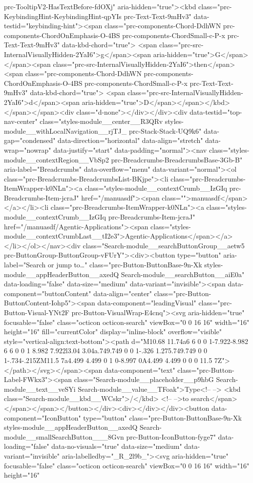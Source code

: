 {{prc-TooltipV2-HasTextBefore-fdOXj" aria-hidden="true"><kbd class="prc-KeybindingHint-KeybindingHint-qpYIs prc-Text-Text-9mHv3" data-testid="keybinding-hint"><span class="prc-components-Chord-DdhWN prc-components-ChordOnEmphasis-O-4BS prc-components-ChordSmall-c-P-x prc-Text-Text-9mHv3" data-kbd-chord="true"> <span class="prc-src-InternalVisuallyHidden-2YaI6">g</span><span aria-hidden="true">G</span></span><span class="prc-src-InternalVisuallyHidden-2YaI6">then</span> <span class="prc-components-Chord-DdhWN prc-components-ChordOnEmphasis-O-4BS prc-components-ChordSmall-c-P-x prc-Text-Text-9mHv3" data-kbd-chord="true"> <span class="prc-src-InternalVisuallyHidden-2YaI6">d</span><span aria-hidden="true">D</span></span></kbd></span></span><div class="d-none"></div></div><div data-testid="top-nav-center" class="styles-module__center__R3QRv styles-module__withLocalNavigation__rjTJ_ prc-Stack-Stack-UQ9k6" data-gap="condensed" data-direction="horizontal" data-align="stretch" data-wrap="nowrap" data-justify="start" data-padding="normal"><nav class="styles-module__contextRegion__VbSp2 prc-Breadcrumbs-BreadcrumbsBase-3Gb-B" aria-label="Breadcrumbs" data-overflow="menu" data-variant="normal"><ol class="prc-Breadcrumbs-BreadcrumbsList-BKjpe"><li class="prc-Breadcrumbs-ItemWrapper-k0NLn"><a class="styles-module__contextCrumb__IzGIq prc-Breadcrumbs-Item-jcraJ" href="/manuasdf"><span class="">manuasdf</span></a></li><li class="prc-Breadcrumbs-ItemWrapper-k0NLn"><a class="styles-module__contextCrumb__IzGIq prc-Breadcrumbs-Item-jcraJ" href="/manuasdf/Agentic-Applications"><span class="styles-module__contextCrumbLast__tI2e3">Agentic-Applications</span></a></li></ol></nav><div class="Search-module__searchButtonGroup__aetw5 prc-ButtonGroup-ButtonGroup-vFUrY"><div><button type="button" aria-label="Search or jump to…" class="prc-Button-ButtonBase-9n-Xk styles-module__appHeaderButton__axedQ Search-module__searchButton__aiE0a" data-loading="false" data-size="medium" data-variant="invisible"><span data-component="buttonContent" data-align="center" class="prc-Button-ButtonContent-Iohp5"><span data-component="leadingVisual" class="prc-Button-Visual-YNt2F prc-Button-VisualWrap-E4cnq"><svg aria-hidden="true" focusable="false" class="octicon octicon-search" viewBox="0 0 16 16" width="16" height="16" fill="currentColor" display="inline-block" overflow="visible" style="vertical-align:text-bottom"><path d="M10.68 11.74a6 6 0 0 1-7.922-8.982 6 6 0 0 1 8.982 7.922l3.04 3.04a.749.749 0 0 1-.326 1.275.749.749 0 0 1-.734-.215ZM11.5 7a4.499 4.499 0 1 0-8.997 0A4.499 4.499 0 0 0 11.5 7Z"></path></svg></span><span data-component="text" class="prc-Button-Label-FWkx3"><span class="Search-module__placeholder__p9hbG Search-module__text__veSYi Search-module__value__TFoak">Type<!-- --> <kbd class="Search-module__kbd__WCskr">/</kbd> <!-- -->to search</span></span></span></button></div><div></div></div><button data-component="IconButton" type="button" class="prc-Button-ButtonBase-9n-Xk styles-module__appHeaderButton__axedQ Search-module__smallSearchButton___8Gvn prc-Button-IconButton-fyge7" data-loading="false" data-no-visuals="true" data-size="medium" data-variant="invisible" aria-labelledby="_R_2l9b_"><svg aria-hidden="true" focusable="false" class="octicon octicon-search" viewBox="0 0 16 16" width="16" height="16" }}
